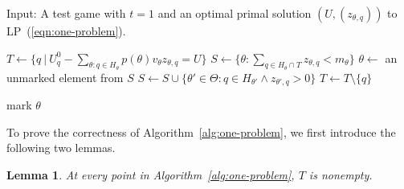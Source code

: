 \documentclass{article}
\newtheorem{lemma}{Lemma}
\begin{document}

\begin{algorithm}
\caption{Input: A test game with $t = 1$ and an optimal primal solution $(U, (z_{\theta,q}))$ to LP~(\ref{eqn:one-problem}).}
\label{alg:one-problem}
\begin{algorithmic}[1]
	\State $T \gets \{q ~|~ U^0_q  - \sum_{\theta: q \in H_\theta}
        p(\theta) v_\theta z_{\theta,q} = U\}$
	\State $S \gets \{\theta : \sum_{q \in H_\theta \cap T} z_{\theta,q} < m_\theta\}$
	\label{line:first-potential}
		\State $\theta \gets $ an unmarked element from $S$
			\State $S \gets S \cup \{\theta' \in \Theta: q \in
                        H_{\theta'} \wedge z_{\theta', q}>0\}$
			\State $T \gets T \setminus \{q\}$\label{line:delete-a}

				\label{line:second-potential}
			\label{line:second-push}
		\EndFor
	\State mark $\theta$
	\EndWhile
	\State {}
\end{algorithmic}
\end{algorithm}

To  prove the correctness of Algorithm~\ref{alg:one-problem}, we first
introduce the following two lemmas.

\begin{lemma}\label{lemma:non-empty}
At every point in Algorithm~\ref{alg:one-problem}, $T$ is nonempty.
\end{lemma}
\end{document}
